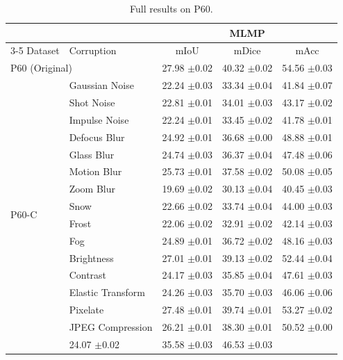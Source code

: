\documentclass{article}
\begin{document}
\begin{table}[t]
\centering
\caption{Full results on P60.}
\label{tab:results_p60}
\begin{tabular}{ll|ccc}
\toprule
 & & \multicolumn{3}{c}{MLMP} \\
\cmidrule(lr){3-5}
Dataset & Corruption & mIoU & mDice & mAcc \\
\midrule
\multicolumn{2}{l}{P60 (Original)} & 27.98 {\scriptsize $\pm$0.02} & 40.32 {\scriptsize $\pm$0.02} & 54.56 {\scriptsize $\pm$0.03} \\
\multirow{16}{*}{P60-C} & Gaussian Noise & 22.24 {\scriptsize $\pm$0.03} & 33.34 {\scriptsize $\pm$0.04} & 41.84 {\scriptsize $\pm$0.07} \\
 & Shot Noise & 22.81 {\scriptsize $\pm$0.01} & 34.01 {\scriptsize $\pm$0.03} & 43.17 {\scriptsize $\pm$0.02} \\
 & Impulse Noise & 22.24 {\scriptsize $\pm$0.01} & 33.45 {\scriptsize $\pm$0.02} & 41.78 {\scriptsize $\pm$0.01} \\
 & Defocus Blur & 24.92 {\scriptsize $\pm$0.01} & 36.68 {\scriptsize $\pm$0.00} & 48.88 {\scriptsize $\pm$0.01} \\
 & Glass Blur & 24.74 {\scriptsize $\pm$0.03} & 36.37 {\scriptsize $\pm$0.04} & 47.48 {\scriptsize $\pm$0.06} \\
 & Motion Blur & 25.73 {\scriptsize $\pm$0.01} & 37.58 {\scriptsize $\pm$0.02} & 50.08 {\scriptsize $\pm$0.05} \\
 & Zoom Blur & 19.69 {\scriptsize $\pm$0.02} & 30.13 {\scriptsize $\pm$0.04} & 40.45 {\scriptsize $\pm$0.03} \\
 & Snow & 22.66 {\scriptsize $\pm$0.02} & 33.74 {\scriptsize $\pm$0.04} & 44.00 {\scriptsize $\pm$0.03} \\
 & Frost & 22.06 {\scriptsize $\pm$0.02} & 32.91 {\scriptsize $\pm$0.02} & 42.14 {\scriptsize $\pm$0.03} \\
 & Fog & 24.89 {\scriptsize $\pm$0.01} & 36.72 {\scriptsize $\pm$0.02} & 48.16 {\scriptsize $\pm$0.03} \\
 & Brightness & 27.01 {\scriptsize $\pm$0.01} & 39.13 {\scriptsize $\pm$0.02} & 52.44 {\scriptsize $\pm$0.04} \\
 & Contrast & 24.17 {\scriptsize $\pm$0.03} & 35.85 {\scriptsize $\pm$0.04} & 47.61 {\scriptsize $\pm$0.03} \\
 & Elastic Transform & 24.26 {\scriptsize $\pm$0.03} & 35.70 {\scriptsize $\pm$0.03} & 46.06 {\scriptsize $\pm$0.06} \\
 & Pixelate & 27.48 {\scriptsize $\pm$0.01} & 39.74 {\scriptsize $\pm$0.01} & 53.27 {\scriptsize $\pm$0.02} \\
 & JPEG Compression & 26.21 {\scriptsize $\pm$0.01} & 38.30 {\scriptsize $\pm$0.01} & 50.52 {\scriptsize $\pm$0.00} \\
\cmidrule(l){2-5}
\multicolumn{2}{l}{\textit{P60-C Average}} & 24.07 {\scriptsize $\pm$0.02} & 35.58 {\scriptsize $\pm$0.03} & 46.53 {\scriptsize $\pm$0.03} \\
\bottomrule
\end{tabular}
\end{table}
\end{document}
